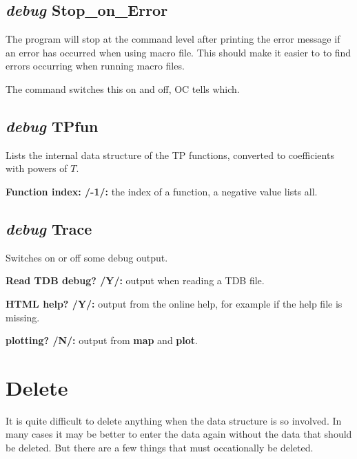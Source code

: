 \documentclass[11pt]{article}
\begin{document}
\hypertarget{Debug stop-on-error}{}
\subsection{{\em debug} Stop\_on\_Error}

The program will stop at the command level after printing the error
message if an error has occurred when using macro file.  This should
make it easier to to find errors occurring when running macro files.

The command switches this on and off, OC tells which.

\hypertarget{Debug TPfun}{}
\subsection{{\em debug} TPfun}

Lists the internal data structure of the TP functions, converted to
coefficients with powers of $T$.

{\bf Function index: /-1/:} the index of a function, a negative value
lists all.

\hypertarget{Debug trace}{}
\subsection{{\em debug} Trace}

Switches on or off some debug output.

\hypertarget{Debug dbcheck}{}
{\bf Read TDB debug? /Y/:} output when reading a TDB file.

{\bf HTML help? /Y/:} output from the online help, for example if the
help file is missing.

\hypertarget{Debug plot}{}
{\bf plotting? /N/:} output from {\bf map} and {\bf plot}.

\hypertarget{Delete}{}
\section{Delete }

It is quite difficult to delete anything when the data structure is so
involved.  In many cases it may be better to enter the data again
without the data that should be deleted.  But there are a few things
that must occationally be deleted.
\end{document}
